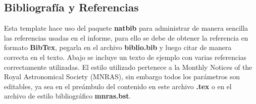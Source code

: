 \documentclass[11pt,letterpaper]{article}
\begin{document}
\subsection*{Bibliografía y Referencias}
Esta template hace uso del paquete \textbf{natbib} para administrar de manera sencilla las referencias usadas en el informe, para ello se debe de obtener la referencia en formato \textbf{BibTex}, pegarla en el archivo \textbf{biblio.bib} y luego citar de manera correcta en el texto. Abajo se incluye un texto de ejemplo con varias referencias correctamente utilizadas. El estilo utilizado pertenece a la Monthly Notices of the Royal Astronomical Society (MNRAS), sin embargo todos los parámetros son editables, ya sea en el preámbulo del contenido en este archivo \textbf{.tex} o en el archivo de estilo bibliográfico \textbf{mnras.bst}.
\end{document}
